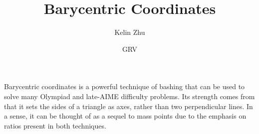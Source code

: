 \documentclass[mast]{lucky}
\title{Barycentric Coordinates}
\author{Kelin Zhu}
\date{GRV}
\begin{document}
\maketitle
Barycentric coordinates is a powerful technique of bashing that can be used to solve many Olympiad and late-AIME difficulty problems. Its strength comes from that it sets the sides of a triangle as axes, rather than two perpendicular lines. In a sense, it can be thought of as a sequel to mass points due to the emphasis on ratios present in both techniques.
\end{document}

